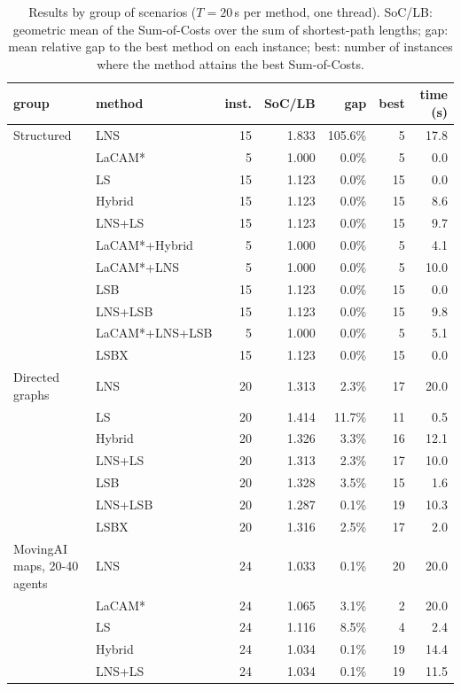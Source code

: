 \begin{table}[t]
\centering\small
\caption{Results by group of scenarios ($T=20$\,s per method, one thread). SoC/LB: geometric mean of the Sum-of-Costs over the sum of shortest-path lengths; gap: mean relative gap to the best method on each instance; best: number of instances where the method attains the best Sum-of-Costs.}
\label{tab:results}
\begin{tabular}{llrrrrr}
\toprule
group & method & inst. & SoC/LB & gap & best & time (s)\\
\midrule
Structured & LNS & 15 & 1.833 & 105.6\% & 5 & 17.8\\
 & LaCAM* & 5 & 1.000 & 0.0\% & 5 & 0.0\\
 & LS & 15 & 1.123 & 0.0\% & 15 & 0.0\\
 & Hybrid & 15 & 1.123 & 0.0\% & 15 & 8.6\\
 & LNS+LS & 15 & 1.123 & 0.0\% & 15 & 9.7\\
 & LaCAM*+Hybrid & 5 & 1.000 & 0.0\% & 5 & 4.1\\
 & LaCAM*+LNS & 5 & 1.000 & 0.0\% & 5 & 10.0\\
 & LSB & 15 & 1.123 & 0.0\% & 15 & 0.0\\
 & LNS+LSB & 15 & 1.123 & 0.0\% & 15 & 9.8\\
 & LaCAM*+LNS+LSB & 5 & 1.000 & 0.0\% & 5 & 5.1\\
 & LSBX & 15 & 1.123 & 0.0\% & 15 & 0.0\\
\midrule
Directed graphs & LNS & 20 & 1.313 & 2.3\% & 17 & 20.0\\
 & LS & 20 & 1.414 & 11.7\% & 11 & 0.5\\
 & Hybrid & 20 & 1.326 & 3.3\% & 16 & 12.1\\
 & LNS+LS & 20 & 1.313 & 2.3\% & 17 & 10.0\\
 & LSB & 20 & 1.328 & 3.5\% & 15 & 1.6\\
 & LNS+LSB & 20 & 1.287 & 0.1\% & 19 & 10.3\\
 & LSBX & 20 & 1.316 & 2.5\% & 17 & 2.0\\
\midrule
MovingAI maps, 20-40 agents & LNS & 24 & 1.033 & 0.1\% & 20 & 20.0\\
 & LaCAM* & 24 & 1.065 & 3.1\% & 2 & 20.0\\
 & LS & 24 & 1.116 & 8.5\% & 4 & 2.4\\
 & Hybrid & 24 & 1.034 & 0.1\% & 19 & 14.4\\
 & LNS+LS & 24 & 1.034 & 0.1\% & 19 & 11.5\\

\end{tabular}
\end{table}
